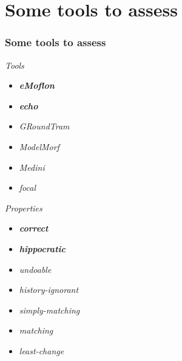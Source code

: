 \documentclass{beamer}
\begin{document}
\section{Some tools to assess}
\begin{frame}
\frametitle{Some tools to assess}
\begin{footnotesize}
\textit{Tools}
\begin{itemize}
\item \textit{\textbf{eMoflon}} \cite{eMoflon}

\item \textit{\textbf{echo}} \cite{echotool}

\item \textit{GRoundTram} \cite{GRoundTram}
 
\item \textit{ModelMorf} \cite{ModelMorf}

\item \textit{Medini} \cite{medini}

\item \textit{focal} \cite{focal}
\end{itemize}
\textit{Properties}
\begin{itemize}
\item \textit{\textbf{correct}} \cite{Perdita1}

\item \textit{\textbf{hippocratic}} \cite{Perdita1} 

\item \textit{undoable} \cite{Perdita2}

\item \textit{history-ignorant} \cite{Perdita2}

\item \textit{simply-matching} \cite{Perdita2}

\item \textit{matching} \cite{Perdita2}

\item \textit{least-change} \cite{echo}
\end{itemize}
\end{footnotesize}

\end{frame}
\end{document}
